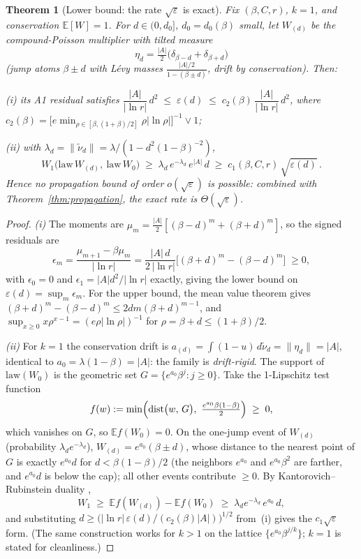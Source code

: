 \documentclass[pdflatex,sn-mathphys-num]{sn-jnl}
\theoremstyle{thmstyleone}
\newtheorem{theorem}{Theorem}
\theoremstyle{thmstyletwo}
\theoremstyle{thmstylethree}
\DeclareMathOperator{\dist}{dist}
\begin{document}
\begin{theorem}[Lower bound: the rate $\sqrt\varepsilon$ is
exact]\label{thm:lower}
Fix $(\beta, C, r)$, $k = 1$, and conservation $\mathbb{E}[W]=1$.
For $d \in (0, d_0]$, $d_0 = d_0(\beta)$ small, let $W_{(d)}$ be the
compound-Poisson multiplier with tilted measure
\[
  \eta_d = \tfrac{|A|}{2}\bigl(\delta_{\beta-d} +
  \delta_{\beta+d}\bigr)
\]
(jump atoms $\beta\pm d$ with L\'evy masses
$\tfrac{|A|/2}{1-(\beta\pm d)}$, drift by conservation).  Then:

\textup{(i)} its A1 residual satisfies
$\dfrac{|A|}{|\ln r|}\,d^2 \;\le\; \varepsilon(d) \;\le\;
c_2(\beta)\,\dfrac{|A|}{|\ln r|}\,d^2$, where $c_2(\beta) =
\bigl[e\min_{\rho\in[\beta,(1+\beta)/2]}\rho|\ln\rho|\bigr]^{-1}
\vee 1$;

\textup{(ii)} with $\lambda_d = \|\tilde\nu_d\| =
\lambda/(1 - d^2(1-\beta)^{-2})$,
\[
  W_1\bigl(\mathrm{law}\,W_{(d)},\ \mathrm{law}\,W_0\bigr)
  \;\ge\; \lambda_d\,e^{-\lambda_d}\,e^{|A|}\,d
  \;\ge\; c_1(\beta, C, r)\,\sqrt{\varepsilon(d)}\,.
\]
Hence no propagation bound of order $o(\sqrt\varepsilon)$ is
possible: combined with Theorem~\ref{thm:propagation}, the exact
rate is $\Theta(\sqrt\varepsilon)$.
\end{theorem}

\begin{proof}
\textit{(i)}  The moments are $\mu_m =
\tfrac{|A|}{2}[(\beta-d)^m + (\beta+d)^m]$, so the signed residuals
are
\[
  \epsilon_m = \frac{\mu_{m+1} - \beta\mu_m}{|\ln r|}
  = \frac{|A|\,d}{2\,|\ln r|}
  \bigl[(\beta+d)^m - (\beta-d)^m\bigr] \;\ge 0,
\]
with $\epsilon_0 = 0$ and $\epsilon_1 = |A|d^2/|\ln r|$ exactly,
giving the lower bound on $\varepsilon(d) = \sup_m \epsilon_m$.  For
the upper bound, the mean value theorem gives $(\beta+d)^m -
(\beta-d)^m \le 2dm(\beta+d)^{m-1}$, and $\sup_{x\ge0} x\rho^{x-1} =
(e\rho|\ln\rho|)^{-1}$ for $\rho = \beta+d \le (1+\beta)/2$.

\textit{(ii)}  For $k=1$ the conservation drift is
$a_{(d)} = \int(1-u)\,d\tilde\nu_d = \|\eta_d\| = |A|$, identical to
$a_0 = \lambda(1-\beta) = |A|$: the family is \emph{drift-rigid}.
The support of $\mathrm{law}(W_0)$ is the geometric set $G =
\{e^{a_0}\beta^j : j \ge 0\}$.  Take the 1-Lipschitz test function
\[
  f(w) := \min\Bigl(\dist\bigl(w,\,G\bigr),\
  \tfrac{e^{a_0}\beta(1-\beta)}{2}\Bigr) \;\ge\; 0,
\]
which vanishes on $G$, so $\mathbb{E}f(W_0) = 0$.  On the one-jump
event of $W_{(d)}$ (probability $\lambda_d e^{-\lambda_d}$),
$W_{(d)} = e^{a_0}(\beta\pm d)$, whose distance to the nearest point
of $G$ is exactly $e^{a_0} d$ for $d < \beta(1-\beta)/2$ (the
neighbors $e^{a_0}$ and $e^{a_0}\beta^2$ are farther, and $e^{a_0}d$ is
below the cap); all other events contribute $\ge 0$.  By
Kantorovich--Rubinstein duality \cite{Vil09},
\[
  W_1 \;\ge\; \mathbb{E}f(W_{(d)}) - \mathbb{E}f(W_0)
  \;\ge\; \lambda_d e^{-\lambda_d}\,e^{a_0}\,d,
\]
and substituting $d \ge \bigl(|\ln r|\,\varepsilon(d) / (c_2(\beta)
|A|)\bigr)^{1/2}$ from~(i) gives the $c_1\sqrt{\varepsilon}$ form.
(The same construction works for $k > 1$ on the lattice
$\{e^{a_0}\beta^{j/k}\}$; $k = 1$ is stated for cleanliness.)
\end{proof}
\end{document}
